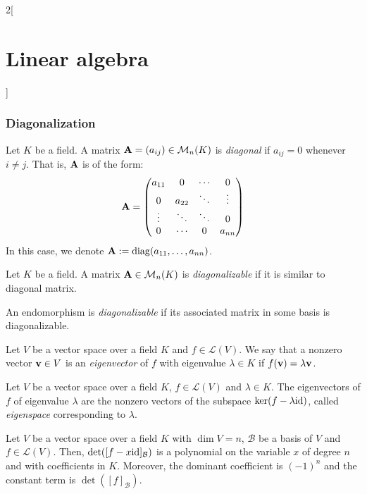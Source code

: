 \documentclass[../../../main.tex]{subfiles}
\begin{document}
\begin{multicols}{2}[\section{Linear algebra}]
  \subsubsection{Diagonalization}
  \begin{definition}
    Let $K$ be a field. A matrix $\boldsymbol{\mathrm{A}}=(a_{ij})\in\mathcal{M}_n(K)$ is \emph{diagonal} if $a_{ij}=0$ whenever $i\ne j$. That is, $\boldsymbol{\mathrm{A}}$ is of the form:
    $$\boldsymbol{\mathrm{A}}=
      \begin{pmatrix}
        a_{11} & 0      & \cdots & 0      \\
        0      & a_{22} & \ddots & \vdots \\
        \vdots & \ddots & \ddots & 0      \\
        0      & \cdots & 0      & a_{nn}
      \end{pmatrix}
    $$
    In this case, we denote $\boldsymbol{\mathrm{A}}:=\operatorname{diag}(a_{11},\ldots,a_{nn})$.
  \end{definition}
  \begin{definition}
    Let $K$ be a field. A matrix $\boldsymbol{\mathrm{A}}\in\mathcal{M}_n(K)$ is \emph{diagonalizable} if it is similar to diagonal matrix.
  \end{definition}
  \begin{definition}
    An endomorphism is \emph{diagonalizable} if its associated matrix in some basis is diagonalizable.
  \end{definition}
  \begin{definition}
    Let $V$ be a vector space over a field $K$ and $f\in\mathcal{L}(V)$. We say that a nonzero vector $\boldsymbol{\mathrm{v}}\in V$ is an \emph{eigenvector} of $f$ with eigenvalue $\lambda\in K$ if $f(\boldsymbol{\mathrm{v}})=\lambda \boldsymbol{\mathrm{v}}$.
  \end{definition}
  \begin{lemma}
    Let $V$ be a vector space over a field $K$, $f\in\mathcal{L}(V)$ and $\lambda\in K$. The eigenvectors of $f$ of eigenvalue $\lambda$ are the nonzero vectors of the subspace $\ker(f-\lambda\mathrm{id})$, called \emph{eigenspace} corresponding to $\lambda$.
  \end{lemma}
  \begin{lemma}
    Let $V$ be a vector space over a field $K$ with $\dim V=n$, $\mathcal{B}$ be a basis of $V$ and $f\in\mathcal{L}(V)$. Then, $\det([f-x\mathrm{id}]_\mathcal{B})$ is a polynomial on the variable $x$ of degree $n$ and with coefficients in $K$. Moreover, the dominant coefficient is $(-1)^n$ and the constant term is $\det([f]_\mathcal{B})$.
  \end{lemma}
  \begin{corollary}

\end{corollary}
\end{multicols}
\end{document}
